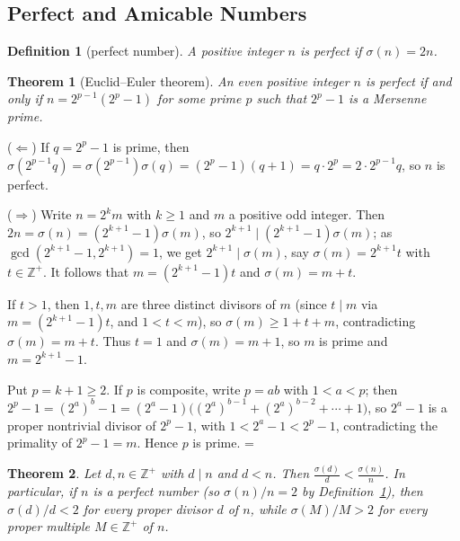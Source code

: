 \documentclass[11pt]{article}
\makeatletter
\let\nt@closedisplay\]
\def\nt@guardedclose{\@ifnextchar\par{\nt@closeafterpar}{\@ifnextchar\end{\postdisplaypenalty\@M\nt@closedisplay}{\nt@closedisplay}}}
\def\nt@closeafterpar\par{\@ifnextchar\par{\nt@closeafterpar}{\@ifnextchar\end{\postdisplaypenalty\@M\nt@closedisplay\par}{\nt@closedisplay\par}}}
\renewenvironment{proof}[1][\proofname]{\par
  \pushQED{\qed}\normalfont\topsep\medskipamount\edef\nt@afterproof{\@endparpenalty=\the\@endparpenalty\relax}\@beginparpenalty\@M\@endparpenalty\@M\let\]\nt@guardedclose\trivlist\item[]\textit{#1\@addpunct{.}} \ignorespaces}{\ifvmode\addpenalty\@M\fi\popQED\nt@afterproof\endtrivlist\@endpefalse}
\theoremstyle{ntstyle}
\newtheorem{theorem}{Theorem}[subsection]
\newtheorem{definition}{Definition}[subsection]
\makeatother
\begin{document}
\subsection{Perfect and Amicable Numbers}

\begin{definition}[perfect number]\label{def:5.2.1}\label{def:perfect-number}
  A positive integer $n$ is perfect if $\sigma(n) = 2n$.

\end{definition}

\begin{theorem}[Euclid--Euler theorem]\label{thm:5.2.1}\label{thm:euclid-euler-theorem}
  An even positive integer
  $n$ is perfect if and only if
  $n = 2^{p-1}(2^{p}-1)$ for some prime $p$ such that $2^{p}-1$ is a Mersenne prime.

\end{theorem}

\begin{proof} ($\Leftarrow$) If $q = 2^p-1$ is prime,
  then $\sigma(2^{p-1}q) = \sigma(2^{p-1})\sigma(q) = (2^p-1)(q+1) = q\cdot 2^p = 2\cdot 2^{p-1}q$, so $n$ is perfect.

  ($\Rightarrow$) Write $n=2^km$ with $k\ge1$ and $m$ a positive odd integer. Then
  $2n = \sigma(n) = (2^{k+1}-1)\sigma(m)$, so $2^{k+1}\mid (2^{k+1}-1)\sigma(m)$; as
  $\gcd(2^{k+1}-1, 2^{k+1})=1$, we get $2^{k+1}\mid\sigma(m)$, say
  $\sigma(m)=2^{k+1}t$ with $t\in\mathbb{Z}^+$. It follows that
  $m=(2^{k+1}-1)t$ and $\sigma(m)=m+t$.

  If $t>1$,
  then $1, t, m$ are three distinct divisors of $m$ (since $t\mid m$
  via $m=(2^{k+1}-1)t$, and $1<t<m$), so $\sigma(m)\ge 1+t+m$,
  contradicting $\sigma(m)=m+t$. Thus $t=1$ and $\sigma(m) = m+1$, so $m$
  is prime and $m=2^{k+1}-1$.

  Put $p=k+1\ge2$. If $p$ is composite, write $p = ab$ with $1 < a < p$; then
  $2^{p}-1 = (2^{a})^{b} - 1 = (2^{a}-1)\big((2^{a})^{b-1} + (2^{a})^{b-2} + \cdots + 1\big)$, so
  $2^{a}-1$ is a proper nontrivial divisor of $2^{p}-1$, with $1 < 2^{a}-1 < 2^{p}-1$, contradicting the primality
  of $2^{p}-1 = m$.
  Hence $p$ is prime.
\end{proof}

\begin{theorem}\label{thm:5.2.2} Let $d,n\in\mathbb{Z}^+$ with $d\mid n$ and
  $d<n$. Then
  $\tfrac{\sigma(d)}{d}<\tfrac{\sigma(n)}{n}$. In particular, if $n$ is
  a perfect number (so $\sigma(n)/n=2$ by Definition~\ref{def:5.2.1}), then
  $\sigma(d)/d<2$ for every proper divisor $d$ of $n$, while
  $\sigma(M)/M>2$ for every proper multiple $M\in\mathbb{Z}^+$ of $n$.

\end{theorem}
\end{document}
